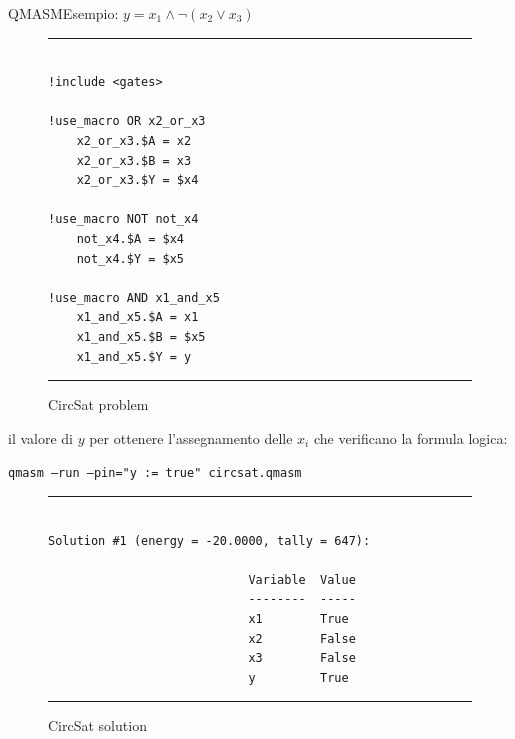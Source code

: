 \begin{frame}[fragile]{QMASM}{Esempio: $y = x_1 \land \neg(x_2 \lor x_3)$}
	\begin{center}
		\begin{minipage}{.25\linewidth}
			\begin{figure}[h]
				\begin{minipage}{\linewidth}
					\hrule
					\begin{verbatim}
						
!include <gates>

!use_macro OR x2_or_x3
	x2_or_x3.$A = x2
	x2_or_x3.$B = x3
	x2_or_x3.$Y = $x4

!use_macro NOT not_x4
	not_x4.$A = $x4
	not_x4.$Y = $x5

!use_macro AND x1_and_x5
	x1_and_x5.$A = x1
	x1_and_x5.$B = $x5
	x1_and_x5.$Y = y
					\end{verbatim}
					\hrule
				\end{minipage}
				\caption{CircSat problem}
			\end{figure}
		\end{minipage}
		\hspace{1cm}
		\begin{minipage}{.6\linewidth}
			\begin{block}{}
				 il valore di $y$ per ottenere l'assegnamento delle $x_i$ che verificano la formula logica:
				\begin{center}
					\scriptsize \texttt{qmasm --run --pin="y := true" circsat.qmasm}
				\end{center}
			\end{block}
			\begin{figure}[h]
				\centering
				\begin{minipage}{.72\linewidth}
					\hrule
					\begin{verbatim}
						
Solution #1 (energy = -20.0000, tally = 647):

							Variable  Value
							--------  -----
							x1        True
							x2        False
							x3        False
							y         True
					\end{verbatim}
					\hrule
				\end{minipage}
				\caption{CircSat solution}
			\end{figure}
		\end{minipage}
	\end{center}
\end{frame}

